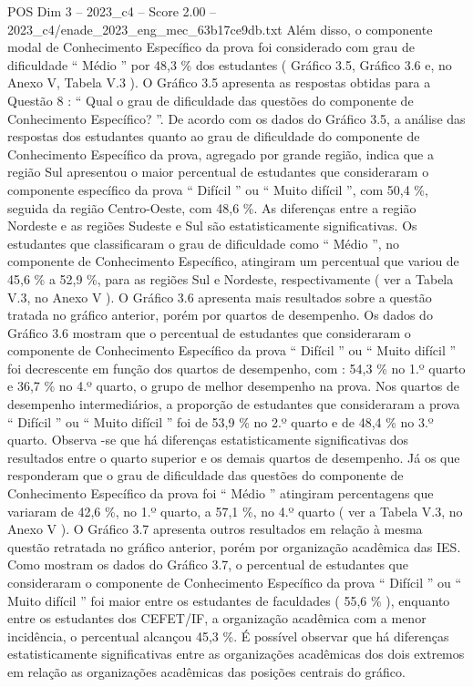 \begin{textsample}{POS Dim 3 – 2023\_c4 – Score 2.00 – 2023\_c4/enade\_2023\_eng\_mec\_63b17ce9db.txt}
Além disso, o componente modal de Conhecimento Específico da prova foi considerado com grau de dificuldade “ Médio ” por 48,3 \% dos estudantes ( Gráfico 3.5, Gráfico 3.6 e, no Anexo V, Tabela V.3 ).
O Gráfico 3.5 apresenta as respostas obtidas para a Questão 8 : “ Qual o grau de dificuldade das questões do componente de Conhecimento Específico? ”.
De acordo com os dados do Gráfico 3.5, a análise das respostas dos estudantes quanto ao grau de dificuldade do componente de Conhecimento Específico da prova, agregado por grande região, indica que a região Sul apresentou o maior percentual de estudantes que consideraram o componente específico da prova “ Difícil ” ou “ Muito difícil ”, com 50,4 \%, seguida da região Centro-Oeste, com 48,6 \%.
As diferenças entre a região Nordeste e as regiões Sudeste e Sul são estatisticamente significativas.
Os estudantes que classificaram o grau de dificuldade como “ Médio ”, no componente de Conhecimento Específico, atingiram um percentual que variou de 45,6 \% a 52,9 \%, para as regiões Sul e Nordeste, respectivamente ( ver a Tabela V.3, no Anexo V ).
O Gráfico 3.6 apresenta mais resultados sobre a questão tratada no gráfico anterior, porém por quartos de desempenho.
Os dados do Gráfico 3.6 mostram que o percentual de estudantes que consideraram o componente de Conhecimento Específico da prova “ Difícil ” ou “ Muito difícil ” foi decrescente em função dos quartos de desempenho, com : 54,3 \% no 1.º quarto e 36,7 \% no 4.º quarto, o grupo de melhor desempenho na prova.
Nos quartos de desempenho intermediários, a proporção de estudantes que consideraram a prova “ Difícil ” ou “ Muito difícil ” foi de 53,9 \% no 2.º quarto e de 48,4 \% no 3.º quarto.
Observa -se que há diferenças estatisticamente significativas dos resultados entre o quarto superior e os demais quartos de desempenho.
Já os que responderam que o grau de dificuldade das questões do componente de Conhecimento Específico da prova foi “ Médio ” atingiram percentagens que variaram de 42,6 \%, no 1.º quarto, a 57,1 \%, no 4.º quarto ( ver a Tabela V.3, no Anexo V ).
O Gráfico 3.7 apresenta outros resultados em relação à mesma questão retratada no gráfico anterior, porém por organização acadêmica das IES.
Como mostram os dados do Gráfico 3.7, o percentual de estudantes que consideraram o componente de Conhecimento Específico da prova “ Difícil ” ou “ Muito difícil ” foi maior entre os estudantes de faculdades ( 55,6 \% ), enquanto entre os estudantes dos CEFET/IF, a organização acadêmica com a menor incidência, o percentual alcançou 45,3 \%.
É possível observar que há diferenças estatisticamente significativas entre as organizações acadêmicas dos dois extremos em relação as organizações acadêmicas das posições centrais do gráfico.

\end{textsample}
